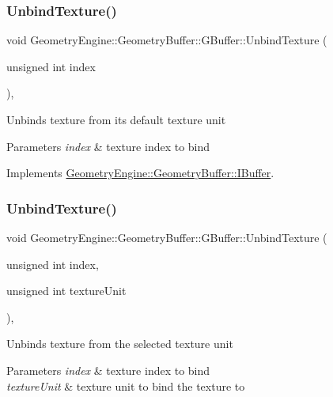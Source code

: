 \subsubsection{\texorpdfstring{UnbindTexture()}{UnbindTexture()}\hspace{0.1cm}{\footnotesize\ttfamily [1/4]}}
{\footnotesize\ttfamily void Geometry\+Engine\+::\+Geometry\+Buffer\+::\+G\+Buffer\+::\+Unbind\+Texture (\begin{DoxyParamCaption}\item[{unsigned int}]{index }\end{DoxyParamCaption})\hspace{0.3cm}{\ttfamily [override]}, {\ttfamily [virtual]}}

Unbinds texture from its default texture unit 
\begin{DoxyParams}{Parameters}
{\em index} & texture index to bind \\
\hline
\end{DoxyParams}


Implements \mbox{\hyperlink{class_geometry_engine_1_1_geometry_buffer_1_1_i_buffer_a6130240d58d277cb9e897dfd1924613e}{Geometry\+Engine\+::\+Geometry\+Buffer\+::\+I\+Buffer}}.

\mbox{\label{class_geometry_engine_1_1_geometry_buffer_1_1_g_buffer_a1f02674c4ff24debb9f4b1b6d1243a9b}} 
\subsubsection{\texorpdfstring{UnbindTexture()}{UnbindTexture()}\hspace{0.1cm}{\footnotesize\ttfamily [2/4]}}
{\footnotesize\ttfamily void Geometry\+Engine\+::\+Geometry\+Buffer\+::\+G\+Buffer\+::\+Unbind\+Texture (\begin{DoxyParamCaption}\item[{unsigned int}]{index,  }\item[{unsigned int}]{texture\+Unit }\end{DoxyParamCaption})\hspace{0.3cm}{\ttfamily [override]}, {\ttfamily [virtual]}}

Unbinds texture from the selected texture unit 
\begin{DoxyParams}{Parameters}
{\em index} & texture index to bind \\
\hline
{\em texture\+Unit} & texture unit to bind the texture to \\
\hline
\end{DoxyParams}


